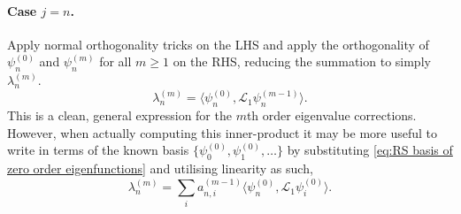 \documentclass[11pt]{amsart}
\begin{document}
\paragraph{Case $j= n$.} Apply normal orthogonality tricks on the LHS and apply the orthogonality of $\psi_n^{(0)}$ and $\psi_n^{(m)}$ for all $m\geq1$ on the RHS, reducing the summation to simply $\lambda_n^{(m)}$.
\begin{equation*}
    \lambda_n^{(m)} = \langle\psi_n^{(0)},\mathcal{L}_1\psi_n^{(m-1)}\rangle .
\end{equation*}
This is a clean, general expression for the $m$th order eigenvalue corrections. However, when actually computing this inner-product it may be more useful to write in terms of the known basis $\{\psi_0^{(0)}, \psi_1^{(0)}, \dots\}$ by substituting \cref{eq:RS basis of zero order eigenfunctions} and utilising linearity as such,
\begin{equation*}
    \lambda_n^{(m)} = \sum_{i} a_{n,i}^{(m-1)}\langle\psi_n^{(0)},\mathcal{L}_1 \psi_i^{(0)} \rangle .
\end{equation*}
\end{document}
